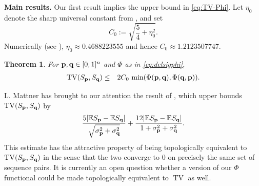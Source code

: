 \documentclass[11pt]{amsart}
\theoremstyle{plain}
\newtheorem{theorem}{Theorem}[section]
\theoremstyle{definition}
\DeclareMathOperator{\TV}{TV}
\newcommand{\E}{\mathbb{E}}
\newcommand{\beq}{\begin{eqnarray*}}
\newcommand{\eeq}{\end{eqnarray*}}
\newcommand{\eqdef}{:=}
\newcommand{\etaBCV}{\eta_0}
\newcommand{\CBCV}{C_0}
\renewcommand{\vec}[1]{\textup{{\bf #1}}}
\begin{document}
\medskip\noindent\textbf{Main results.}
Our first result implies the upper bound in \eqref{eq:TV-Phi}.
Let $\etaBCV$ denote the sharp universal constant from
\cite[Theorem~1]{BAILLON_COMINETTI_VAISMAN_2016},
and set
\[
\CBCV \eqdef \sqrt{\frac54+\etaBCV^2}.
\]
Numerically (see \cite[Remark~1]{BAILLON_COMINETTI_VAISMAN_2016}),
$\etaBCV\approx 0.4688223555$ and hence $\CBCV\approx 1.2123507747$.
\begin{theorem}
\label{thm:PB-upper-Phi}
For $\vec{p},\vec{q}\in[0,1]^n$
and $\Phi$ as in \eqref{eq:delsigphi},
\beq
\TV(S_{\vec{p}},S_{\vec{q}})
&\le&
2\CBCV\,\min(
\Phi(\vec{p},\vec{q})
,
\Phi(\vec{q},\vec{p})
)
.
\eeq
\end{theorem}
L. Mattner \cite{Mattner2026}
has brought to our attention
the result of \cite{Tasto2015Proximitat},
which upper bounds
$\TV(S_{\vec{p}},S_{\vec{q}})$
by
\beq
\frac{5|
\E S_{\vec{p}}
-
\E S_{\vec{q}}
|}{
\sqrt{
\sigma^2_{\vec{p}}+\sigma^2_{\vec{q}}
}}
+
\frac{12|
\E S_{\vec{p}}
-
\E S_{\vec{q}}
|}{{1+
\sigma^2_{\vec{p}}+\sigma^2_{\vec{q}}
}}.
\eeq
This estimate has the attractive property
of being topologically equivalent to $\TV(S_{\vec{p}},S_{\vec{q}})$
in the sense that the two converge to $0$
on precisely the same set of sequence pairs.
It is currently an open question whether a
version of our $\Phi$ functional could be made
topologically equivalent to $\TV$ as well.
\end{document}
